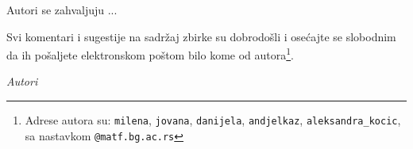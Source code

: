 Autori se zahvaljuju ...

Svi komentari i sugestije na sadržaj zbirke su dobrodošli i osećajte se slobodnim da ih pošaljete elektronskom poštom bilo kome od autora\footnote{Adrese autora su: \texttt{milena}, \texttt{jovana}, \texttt{danijela}, \texttt{andjelkaz}, \texttt{aleksandra\_kocic}, sa nastavkom \texttt{@matf.bg.ac.rs}}. 



\bigskip





\bigskip

\begin{flushright}
{\em Autori}
\end{flushright}